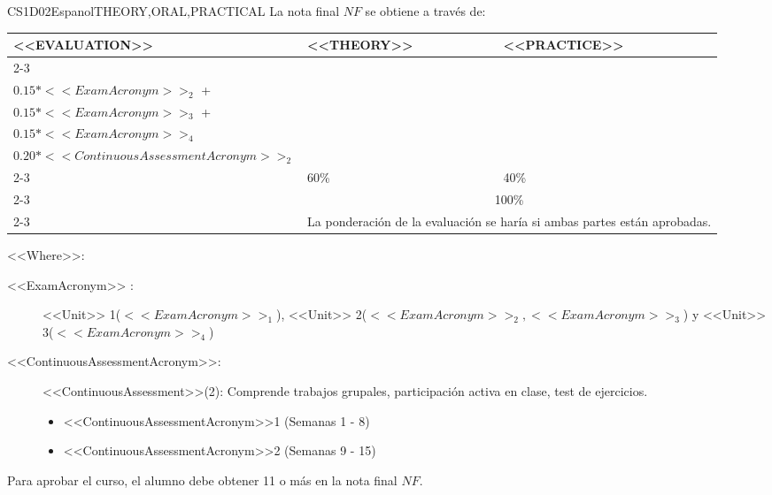  
  \begin{evaluation}{CS1D02}{Espanol}{THEORY,ORAL,PRACTICAL}
    La nota final $NF$ se obtiene a través de:

  \begin{tabularx}{0.9\textwidth}{|X|p{}|p{}|} \hline
  \multirow{4}{*}{\uppercase{<<Evaluation>>}} & \uppercase{<<Theory>>} & \uppercase{<<Practice>>} \\ \cline{2-3}
  & %
      \begin{minipage}{0.95\textwidth}
      \begin{tabular}{l}
          $0.15*<<ExamAcronym>>_{1}$  + \\
          $0.15*<<ExamAcronym>>_{2}$  + \\
          $0.15*<<ExamAcronym>>_{3}$  + \\
          $0.15*<<ExamAcronym>>_{4}$
          \end{tabular} 
      \end{minipage} 
  & %
      \begin{minipage}{0.95\textwidth}
      \begin{tabular}{l}
          $0.20*<<ContinuousAssessmentAcronym>>_{1}$ + \\
          $0.20*<<ContinuousAssessmentAcronym>>_{2}$ 
      \end{tabular} 
      \end{minipage}                 \\ \cline{2-3}

  & %
  60\% 
  & %
  40\% \\ \cline{2-3}
  & \multicolumn{2}{|c|}{100\%}  \\ \cline{2-3}
  & \multicolumn{2}{|c|}{La ponderación de la evaluación se haría si ambas partes están aprobadas.}  \\ \hline
  \end{tabularx}
      
  \vspace{2mm}
  \noindent <<Where>>:
  \begin{description}
    \item[<<ExamAcronym>> :] <<Unit>> 1($<<ExamAcronym>>_{1}$), <<Unit>> 2($<<ExamAcronym>>_{2}, <<ExamAcronym>>_{3}$) y <<Unit>> 3($<<ExamAcronym>>_{4}$) 
    \item[<<ContinuousAssessmentAcronym>>:]<<ContinuousAssessment>>(2): Comprende trabajos grupales, participación activa en clase, test de ejercicios.
    \begin{itemize}
          \item <<ContinuousAssessmentAcronym>>1 (Semanas 1 - 8) 
          \item <<ContinuousAssessmentAcronym>>2 (Semanas 9 - 15)
    \end{itemize}
  \end{description}
 
  \noindent Para aprobar el curso, el alumno debe obtener 11 o más en la nota final $NF$.
  \end{evaluation}
 

